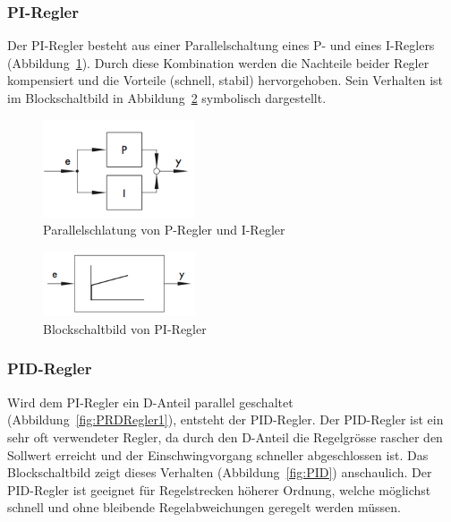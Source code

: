 \subsubsection*{PI-Regler}
Der   PI-Regler   besteht   aus   einer   Parallelschaltung   eines   P-   und
eines   I-Reglers  (Abbildung~\ref{fig:PIRegler1}). Durch   diese  Kombination
werden   die   Nachteile   beider   Regler  kompensiert   und   die   Vorteile
(schnell,  stabil) hervorgehoben. Sein  Verhalten  ist  im Blockschaltbild  in
Abbildung~\ref{fig:PIRegler2} symbolisch dargestellt.

\begin{figure}[h!, width=\pagewidth]
    \centering
    \includegraphics[width=0.4\textwidth]{images/PIRegler1}
    \caption{Parallelschlatung von P-Regler und I-Regler}
    \label{fig:PIRegler1}
\end{figure}

\begin{figure}[h!, width=\pagewidth]
    \centering
    \includegraphics[width=0.4\textwidth]{images/PIRegler2}
    \caption{Blockschaltbild von PI-Regler}
    \label{fig:PIRegler2}
\end{figure}


\subsubsection*{PID-Regler}

Wird      dem     PI-Regler      ein     D-Anteil      parallel     geschaltet
(Abbildung~\ref{fig:PRDRegler1}),  entsteht   der  PID-Regler. Der  PID-Regler
ist   ein  sehr   oft  verwendeter   Regler,   da  durch   den  D-Anteil   die
Regelgr\"osse  rascher   den  Sollwert  erreicht  und   der  Einschwingvorgang
schneller  abgeschlossen  ist. Das   Blockschaltbild  zeigt  dieses  Verhalten
(Abbildung~\ref{fig:PID})  anschaulich. Der  PID-Regler   ist  geeignet  f\"ur
Regelstrecken h\"oherer Ordnung, welche m\"oglichst schnell und ohne bleibende
Regelabweichungen geregelt werden m\"ussen.

